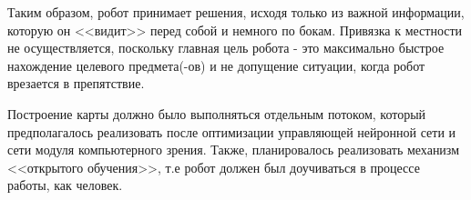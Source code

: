 Таким образом, робот принимает решения, исходя только из важной информации, которую он <<видит>> перед собой и немного по бокам. Привязка к местности не осуществляется, поскольку главная цель робота - это максимально быстрое нахождение целевого предмета(-ов) и не допущение ситуации, когда робот врезается в препятствие.

Построение карты должно было выполняться отдельным потоком, который предполагалось реализовать после оптимизации управляющей нейронной сети и сети модуля компьютерного зрения. Также, планировалось реализовать механизм <<открытого обучения>>, т.е робот должен был доучиваться в процессе работы, как человек.

\clearpage
